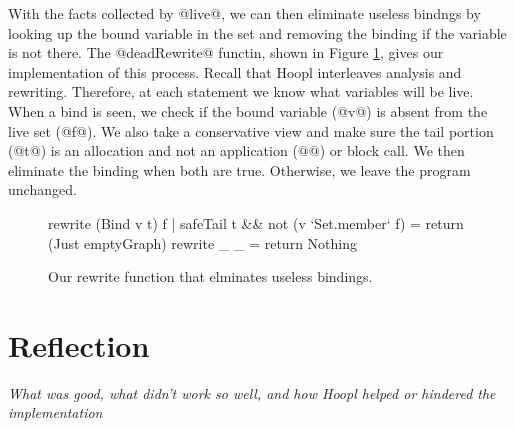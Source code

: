 \documentclass[12pt]{report}
\begin{document}
With the facts collected by @live@, we can then eliminate useless
bindngs by looking up the bound variable in the set and removing the
binding if the variable is not there. The @deadRewrite@ functin,
shown in Figure \ref{ref_fig_deadRewrite}, gives our implementation
of this process. Recall that Hoopl interleaves analysis and
rewriting. %
Therefore, at each statement
we know what variables will be live. When a bind is seen, we check if
the bound variable (@v@) is absent from the live set (@f@). We also
take a conservative view and make sure the tail portion (@t@) is an
allocation and not an application ($@@$) or block call. We then eliminate
the binding when both are true. Otherwise, we leave the program unchanged.

\begin{figure}[h]
\begin{code}
rewrite (Bind v t) f 
  | safeTail t && not (v `Set.member` f) = return (Just emptyGraph)
rewrite _ _ = return Nothing
\end{code}
\caption{Our rewrite function that elminates useless bindings.}
\label{ref_fig_deadRewrite}
\end{figure}


\section{Reflection}
\emph{What was good, what didn't work so well, and how Hoopl helped
or hindered the implementation}
\end{document}
